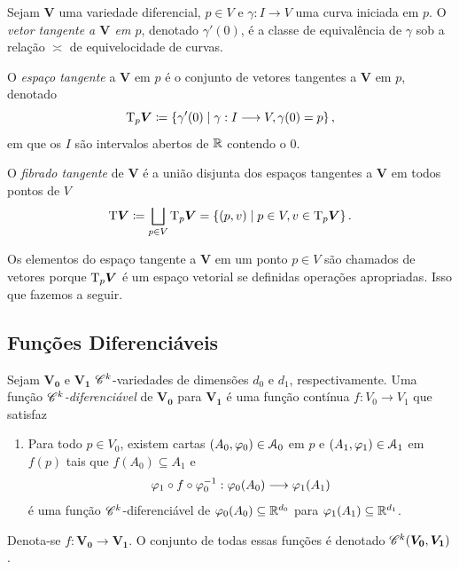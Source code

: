 \begin{defi}
Sejam $\bm V$ uma variedade diferencial, $p \in V$ e $\gamma: I \to V$ uma curva iniciada em $p$. O \emph{vetor tangente a $\bm V$ em $p$}, denotado $\gamma'(0)$, é a classe de equivalência de $\gamma$ sob a relação $\asymp$ de equivelocidade de curvas.

O \emph{espaço tangente} a $\bm V$ em $p$ é o conjunto de vetores tangentes a $\bm V$ em $p$, denotado
	\begin{equation*}
	\mathrm{T}_p\bm V \coloneqq \left\{\gamma'(0) \;\middle\vert\; \gamma: I \longrightarrow V, \gamma(0)=p \right\},
	\end{equation*}
em que os $I$ são intervalos abertos de $\mathbb{R}$ contendo o $0$.

O \emph{fibrado tangente} de $\bm V$ é a união disjunta dos espaços tangentes a $\bm V$ em todos pontos de $V$
	\begin{equation*}
	\mathrm{T}\bm V \coloneqq \bigsqcup_{p  \in V} \mathrm{T}_p\bm V = \left\{(p,v) \;\middle\vert\; p \in V,v \in \mathrm{T}_p\bm V \right\}.
	\end{equation*}
\end{defi}

Os elementos do espaço tangente a $\bm V$ em um ponto $p \in V$ são chamados de vetores porque $\mathrm{T}_p \bm V$ é um espaço vetorial se definidas operações apropriadas. Isso que fazemos a seguir.

\subsection{Funções Diferenciáveis}

\begin{defi}
Sejam $\bm{V_0}$ e $\bm{V_1}$ $\mathscr{C}^k$-variedades de dimensões $d_0$ e $d_1$, respectivamente. Uma função \emph{$\mathscr{C}^k$-diferenciável} de $\bm{V_0}$ para $\bm{V_1}$ é uma função contínua $f: V_0 \to V_1$ que satisfaz
	\begin{enumerate}
	\item Para todo $p \in V_0$, existem cartas $(A_0,\varphi_0) \in \mathcal{A}_0$ em $p$ e $(A_1,\varphi_1) \in \mathcal{A}_1$ em $f(p)$ tais que $f(A_0) \subseteq A_1$ e
		\begin{equation*}
		\varphi_1 \circ f \circ \varphi_0^{-1}: \varphi_0(A_0) \longrightarrow \varphi_1(A_1)
		\end{equation*}
é uma função $\mathscr{C}^k$-diferenciável de $\varphi_0(A_0) \subseteq \mathbb{R}^{d_0}$ para $\varphi_1(A_1) \subseteq \mathbb{R}^{d_1}$.
	\end{enumerate}
Denota-se $f: \bm{V_0} \to \bm{V_1}$. O conjunto de todas essas funções é denotado $\mathscr{C}^k(\bm{V_0},\bm{V_1})$.
\end{defi}


